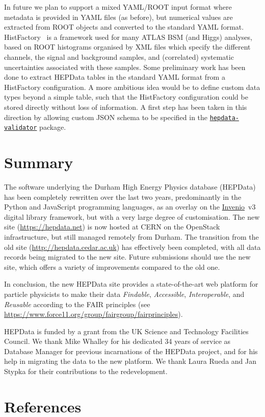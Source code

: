 \documentclass[a4paper]{jpconf}
\begin{document}
In future we plan to support a mixed YAML/ROOT input format where metadata is provided in YAML files (as before), but numerical values are extracted from ROOT objects and converted to the standard YAML format.  HistFactory~\cite{Cranmer:1456844} is a framework used for many ATLAS BSM (and Higgs) analyses, based on ROOT histograms organised by XML files which specify the different channels, the signal and background samples, and (correlated) systematic uncertainties associated with these samples.  Some preliminary work has been done to extract HEPData tables in the standard YAML format from a HistFactory configuration.  A more ambitious idea would be to define custom data types beyond a simple table, such that the HistFactory configuration could be stored directly without loss of information.  A first step has been taken in this direction by allowing custom JSON schema to be specified in the \href{https://github.com/HEPData/hepdata-validator}{\texttt{hepdata-validator}} package.

\section{Summary}

The software underlying the Durham High Energy Physics database (HEPData) has been completely rewritten over the last two years, predominantly in the Python and JavaScript programming languages, as an overlay on the \href{http://inveniosoftware.org}{Invenio}~v3 digital library framework, but with a very large degree of customisation.  The new site (\url{https://hepdata.net}) is now hosted at CERN on the OpenStack infrastructure, but still managed remotely from Durham.  The transition from the old site (\url{http://hepdata.cedar.ac.uk}) has effectively been completed, with all data records being migrated to the new site.  Future submissions should use the new site, which offers a variety of improvements compared to the old one.

In conclusion, the new HEPData site provides a state-of-the-art web platform for particle physicists to make their data \emph{Findable}, \emph{Accessible}, \emph{Interoperable}, and \emph{Reusable} according to the FAIR principles (see \url{https://www.force11.org/group/fairgroup/fairprinciples}).

\ack
HEPData is funded by a grant from the UK Science and Technology Facilities Council.  We thank Mike Whalley for his dedicated 34 years of service as Database Manager for previous incarnations of the HEPData project, and for his help in migrating the data to the new platform.  We thank Laura Rueda and Jan Stypka for their contributions to the redevelopment.

\section*{References}


\end{document}
